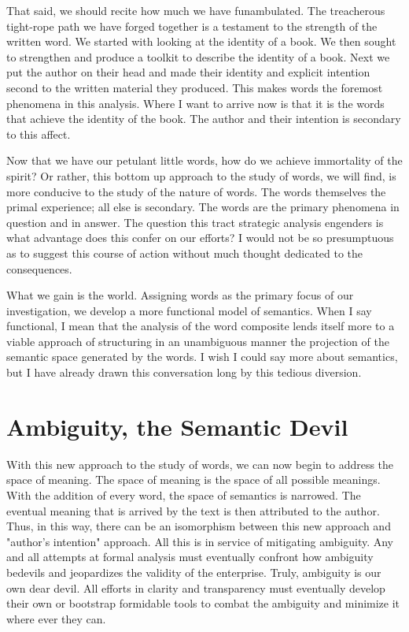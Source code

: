 \documentclass[12pt]{article}
\begin{document}
That said, we should recite how much we have funambulated. The treacherous
tight-rope path we have forged together is a testament to the strength of the
written word. We started with looking at the identity of a book. We then sought
to strengthen and produce a toolkit to describe the identity of a book. Next we
put the author on their head and made their identity and explicit intention
second to the written material they produced. This makes words the foremost
phenomena in this analysis. Where I want to arrive now is that it is the words
that achieve the identity of the book. The author and their intention is
secondary to this affect.

Now that we have our petulant little words, how do we achieve immortality of the
spirit? Or rather, this bottom up approach to the study of words, we will find,
is more conducive to the study of the nature of words. The words themselves the
primal experience; all else is secondary. The words are the primary phenomena in
question and in answer. The question this tract strategic analysis engenders is
what advantage does this confer on our efforts? I would not be so presumptuous
as to suggest this course of action without much thought dedicated to the consequences.

What we gain is the world. Assigning words as the primary focus of our
investigation, we develop a more functional model of semantics. When I say
functional, I mean that the analysis of the word composite lends itself more to
a viable approach of structuring in an unambiguous manner the projection of the
semantic space generated by the words. I wish I could say more about semantics,
but I have already drawn this conversation long by this tedious diversion.

\section{Ambiguity, the Semantic Devil}
With this new approach to the study of words, we can now begin to address the
space of meaning. The space of meaning is the space of all possible meanings.
With the addition of every word, the space of semantics is narrowed. The
eventual meaning that is arrived by the text is then attributed to the author.
Thus, in this way, there can be an isomorphism between this new approach and
"author's intention" approach. All this is in service of mitigating ambiguity.
Any and all attempts at formal analysis must eventually confront how ambiguity
bedevils and jeopardizes the validity of the enterprise. Truly, ambiguity is our
own dear devil. All efforts in clarity and transparency must eventually develop
their own or bootstrap formidable tools to combat the ambiguity and minimize it
where ever they can.
\end{document}
